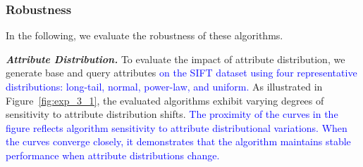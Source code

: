 \documentclass[sigconf, nonacm]{acmart}
\begin{document}
{	
	
	
	
	
	
	
	
	\subsubsection{Robustness}In the following, we evaluate the robustness of these algorithms.
	
	\textit{\textbf{Attribute Distribution.}} To evaluate the impact of attribute distribution, we generate base and query attributes \textcolor{blue}{on the SIFT dataset using four representative distributions: long-tail, normal, power-law, and uniform.}
	As illustrated in Figure~\ref{fig:exp_3_1}, the evaluated algorithms exhibit varying degrees of sensitivity to attribute distribution shifts. \textcolor{blue}{The proximity of the curves in the figure reflects algorithm sensitivity to attribute distributional variations. When the curves converge closely, it demonstrates that the algorithm maintains stable performance when attribute distributions change.} 

}
\end{document}
